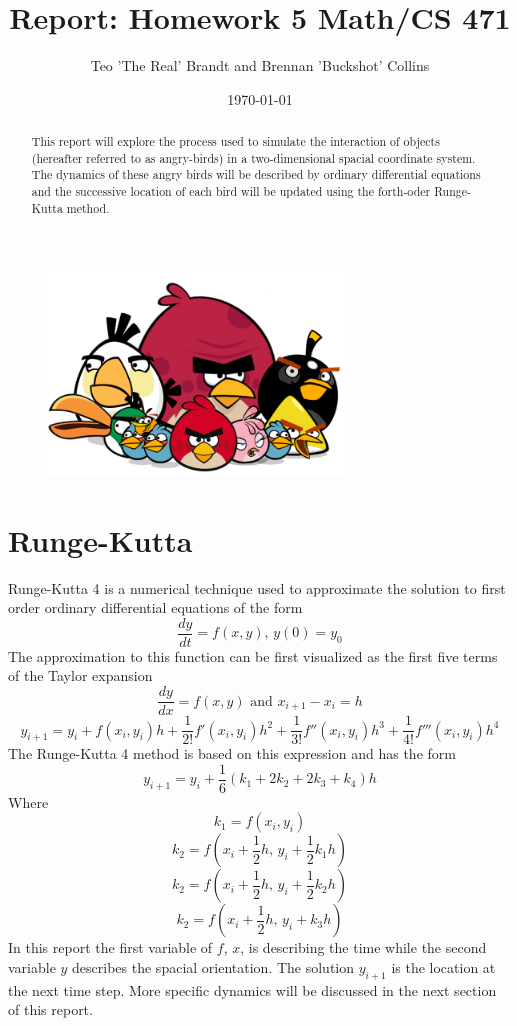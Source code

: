 \documentclass[12pt]{article}
\title{Report: Homework 5 Math/CS 471}
\author{Teo 'The Real' Brandt and Brennan 'Buckshot' Collins}
\date{\today}   %
\theoremstyle{definition}
\theoremstyle{definition}
\begin{document}
\maketitle

\begin{abstract}
This report will explore the process used to simulate the interaction of objects (hereafter referred to as angry-birds) in a two-dimensional spacial coordinate system. The dynamics of these angry birds will be described by ordinary differential equations and the successive location of each bird will be updated using the forth-oder Runge-Kutta method.
\end{abstract}

\begin{figure}[h]
\includegraphics[width=8cm]{angrybirds}
\end{figure}

\section{Runge-Kutta}

\cite{HW}Runge-Kutta 4 is a numerical technique used to approximate the solution to first order ordinary differential equations of the form
\[
\frac{dy}{dt}=f(x,y)\text{,  }y(0)=y_{0}
\]
The approximation to this function can be first visualized as the first five terms of the Taylor expansion
\[
\frac{dy}{dx}=f(x,y)\text{ and }x_{i+1}-x_{i}=h
\]
\[
y_{i+1}=y_{i}+f(x_{i},y_{i})h+\frac{1}{2!}f'(x_{i},y_{i})h^{2}+\frac{1}{3!}f''(x_{i},y_{i})h^{3}+\frac{1}{4!}f'''(x_{i},y_{i})h^{4}
\]
The Runge-Kutta 4 method is based on this expression and has the form
\[
y_{i+1}=y_{i}+\frac{1}{6}(k_{1}+2k_{2}+2k_{3}+k_{4})h
\]
Where
\[k_{1}=f(x_{i},y_{i})\]
\[k_{2}=f(x_{i}+\frac{1}{2}h\text{, }y_{i}+\frac{1}{2}k_{1}h)\]
\[k_{2}=f(x_{i}+\frac{1}{2}h\text{, }y_{i}+\frac{1}{2}k_{2}h)\]
\[k_{2}=f(x_{i}+\frac{1}{2}h\text{, }y_{i}+k_{3}h)\]
In this report the first variable of \(f\), \(x\), is describing the time while the second variable \(y\) describes the spacial orientation. The solution \(y_{i+1}\) is the location at the next time step. More specific dynamics will be discussed in the next section of this report.
\end{document}
